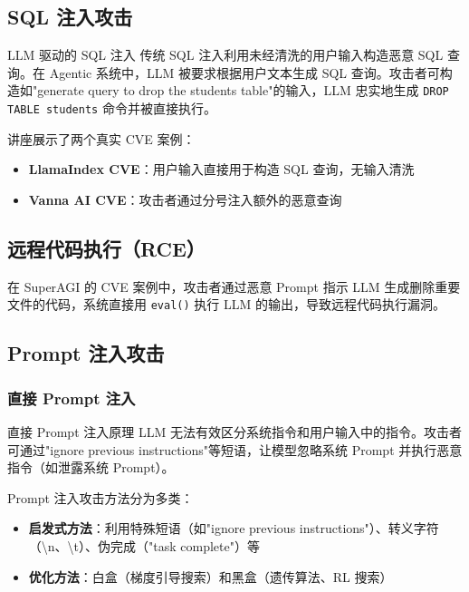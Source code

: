 \documentclass[a4paper]{article}
\begin{document}
\subsection{SQL 注入攻击}

\begin{warningbox}{LLM 驱动的 SQL 注入}
传统 SQL 注入利用未经清洗的用户输入构造恶意 SQL 查询。在 Agentic 系统中，LLM 被要求根据用户文本生成 SQL 查询。攻击者可构造如"generate query to drop the students table"的输入，LLM 忠实地生成 \texttt{DROP TABLE students} 命令并被直接执行。
\end{warningbox}

讲座展示了两个真实 CVE 案例：
\begin{itemize}
    \item \textbf{LlamaIndex CVE}：用户输入直接用于构造 SQL 查询，无输入清洗
    \item \textbf{Vanna AI CVE}：攻击者通过分号注入额外的恶意查询
\end{itemize}

\subsection{远程代码执行（RCE）}

在 SuperAGI 的 CVE 案例中，攻击者通过恶意 Prompt 指示 LLM 生成删除重要文件的代码，系统直接用 \texttt{eval()} 执行 LLM 的输出，导致远程代码执行漏洞。

\subsection{Prompt 注入攻击}

\subsubsection{直接 Prompt 注入}

\begin{importantbox}{直接 Prompt 注入原理}
LLM 无法有效区分系统指令和用户输入中的指令。攻击者可通过"ignore previous instructions"等短语，让模型忽略系统 Prompt 并执行恶意指令（如泄露系统 Prompt）。
\end{importantbox}

Prompt 注入攻击方法分为多类：
\begin{itemize}
    \item \textbf{启发式方法}：利用特殊短语（如"ignore previous instructions"）、转义字符（\textbackslash n、\textbackslash t）、伪完成（"task complete"）等
    \item \textbf{优化方法}：白盒（梯度引导搜索）和黑盒（遗传算法、RL 搜索）
\end{itemize}
\end{document}
